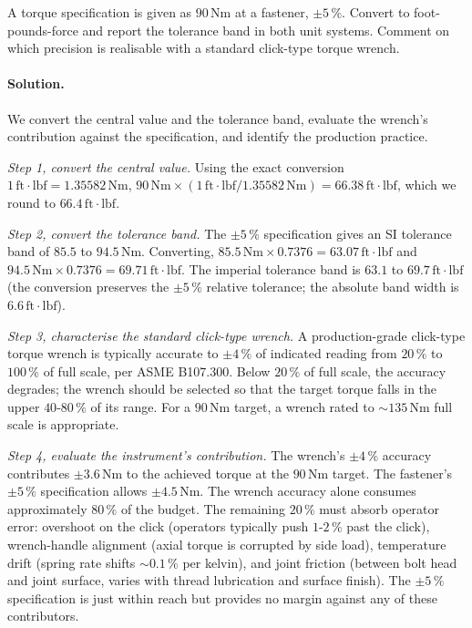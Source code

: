 \begin{exercise}
A torque specification is given as $90 \,\si{\newton\meter}$ at a
fastener, $\pm 5\,\%$. Convert to foot-pounds-force and report the
tolerance band in both unit systems. Comment on which precision is
realisable with a standard click-type torque wrench.

\paragraph{Solution.}
We convert the central value and the tolerance band, evaluate the
wrench's contribution against the specification, and identify the
production practice.

\textit{Step 1, convert the central value.} Using the exact
conversion $1 \,\text{ft}\cdot\text{lbf} = 1.35582 \,\si{\newton
\meter}$, $90 \,\si{\newton\meter} \times (1 \,\text{ft}\cdot\text{
lbf}/1.35582 \,\si{\newton\meter}) = 66.38 \,\text{ft}\cdot\text{lbf}$,
which we round to $66.4 \,\text{ft}\cdot\text{lbf}$.

\textit{Step 2, convert the tolerance band.} The $\pm 5\,\%$
specification gives an SI tolerance band of $85.5$ to $94.5
\,\si{\newton\meter}$. Converting,
$85.5 \,\si{\newton\meter} \times 0.7376 = 63.07 \,\text{ft}\cdot
\text{lbf}$ and $94.5 \,\si{\newton\meter} \times 0.7376 = 69.71
\,\text{ft}\cdot\text{lbf}$. The imperial tolerance band is
$63.1$ to $69.7 \,\text{ft}\cdot\text{lbf}$ (the conversion
preserves the $\pm 5\,\%$ relative tolerance; the absolute band
width is $6.6 \,\text{ft}\cdot\text{lbf}$).

\textit{Step 3, characterise the standard click-type wrench.} A
production-grade click-type torque wrench is typically accurate to
$\pm 4\,\%$ of indicated reading from $20\,\%$ to $100\,\%$ of full
scale, per ASME B107.300. Below $20\,\%$ of full scale, the
accuracy degrades; the wrench should be selected so that the target
torque falls in the upper $40$-$80\,\%$ of its range. For a
$90 \,\si{\newton\meter}$ target, a wrench rated to
$\sim 135 \,\si{\newton\meter}$ full scale is appropriate.

\textit{Step 4, evaluate the instrument's contribution.} The
wrench's $\pm 4\,\%$ accuracy contributes $\pm 3.6 \,\si{\newton
\meter}$ to the achieved torque at the $90 \,\si{\newton\meter}$
target. The fastener's $\pm 5\,\%$ specification allows $\pm 4.5
\,\si{\newton\meter}$. The wrench accuracy alone consumes
approximately $80\,\%$ of the budget. The remaining $20\,\%$ must
absorb operator error: overshoot on the click (operators typically
push $1$-$2\,\%$ past the click), wrench-handle alignment (axial
torque is corrupted by side load), temperature drift (spring rate
shifts $\sim 0.1\,\%$ per kelvin), and joint friction (between bolt
head and joint surface, varies with thread lubrication and surface
finish). The $\pm 5\,\%$ specification is just within reach but
provides no margin against any of these contributors.


\end{exercise}
